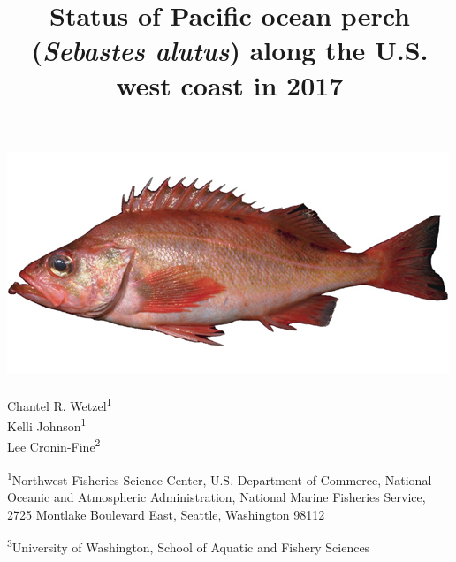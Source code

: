 \documentclass[12pt,]{article}
\title{Status of Pacific ocean perch (\emph{Sebastes alutus}) along the U.S.
west coast in 2017}
\author{}
\date{}
\begin{document}
\maketitle


\begin{center}
\thispagestyle{empty}


\vspace{.5cm}

\includegraphics{Sebastes_alutus}~\\[0.5cm]



Chantel R. Wetzel\textsuperscript{1}\\
Kelli Johnson\textsuperscript{1}\\
Lee Cronin-Fine\textsuperscript{2}\\

\vspace{.5cm}

\small
\textsuperscript{1}Northwest Fisheries Science Center, U.S. Department of Commerce, National Oceanic and Atmospheric Administration, National Marine Fisheries Service, 2725 Montlake Boulevard East, Seattle, Washington 98112\\

\vspace{.3cm}

\textsuperscript{3}University of Washington, School of Aquatic and Fishery Sciences\\

\vspace{.3cm}



\vspace{.5cm}


\end{center}
\end{document}
